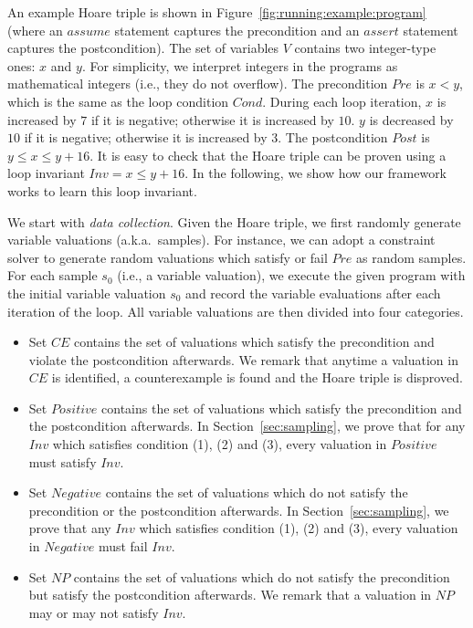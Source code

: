 \begin{example}
An example Hoare triple is shown in Figure~\ref{fig:running:example:program} (where an $assume$ statement captures the precondition and an $assert$ statement captures the postcondition). The set of variables $V$ contains two integer-type ones: $x$ and $y$. For simplicity, we interpret integers in the programs as mathematical integers (i.e., they do not overflow). The precondition $Pre$ is $x < y$, which is the same as the loop condition $Cond$.
During each loop iteration, $x$ is increased by $7$ if it is negative; otherwise it is increased by $10$. $y$ is decreased by $10$ if it is negative; otherwise it is increased by $3$. The postcondition $Post$ is $y \le x \le y + 16$. It is easy to check that the Hoare triple can be proven using a loop invariant $Inv = x \le y + 16$. In the following, we show how our framework works to learn this loop invariant.
\end{example}
We start with \emph{data collection}. Given the Hoare triple, we first randomly generate variable valuations (a.k.a.~samples). For instance, we can adopt a constraint solver to generate random valuations which satisfy or fail $Pre$ as random samples. For each sample $s_0$ (i.e., a variable valuation), we execute the given program with the initial variable valuation $s_0$ and record the variable evaluations after each iteration of the loop. %
All variable valuations are then divided into four categories.
\begin{itemize}
    \item Set $\mathit{CE}$ contains the set of valuations which satisfy the precondition and violate the postcondition afterwards. We remark that anytime a valuation in $\mathit{CE}$ is identified, a counterexample is found and the Hoare triple is disproved. 
    \item Set $\mathit{Positive}$ contains the set of valuations which satisfy the precondition and the postcondition afterwards. In Section~\ref{sec:sampling}, we prove that for any $Inv$ which satisfies condition (1), (2) and (3), every valuation in $\mathit{Positive}$ must satisfy $Inv$.
    \item Set $\mathit{Negative}$ contains the set of valuations which do not satisfy the precondition or the postcondition afterwards. In Section~\ref{sec:sampling}, we prove that any $Inv$ which satisfies condition (1), (2) and (3), every valuation in $\mathit{Negative}$ must fail $Inv$.
    \item Set $\mathit{NP}$ contains the set of valuations which do not satisfy the precondition but satisfy the postcondition afterwards. We remark that a valuation in $\mathit{NP}$ may or may not satisfy $Inv$.
\end{itemize}
